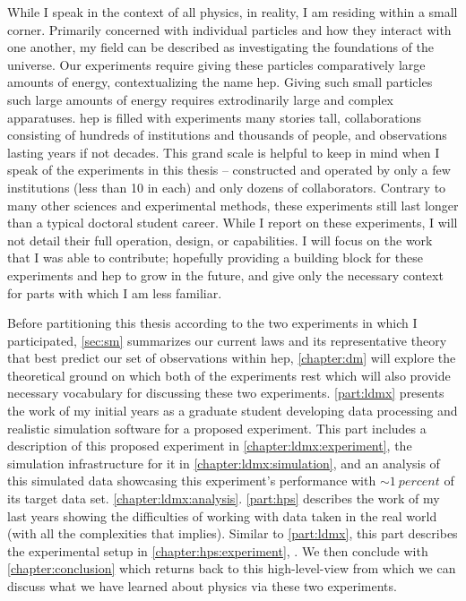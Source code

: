 While I speak in the context of all physics, in reality, I am residing within a small corner.
Primarily concerned with individual particles and how they interact with one another, my field can
be described as investigating the foundations of the universe. Our experiments require giving these
particles comparatively large amounts of energy, contextualizing the name \ac{hep}. Giving
such small particles such large amounts of energy requires extrodinarily large and complex
apparatuses. \ac{hep} is filled with experiments many stories tall, collaborations consisting of
hundreds of institutions and thousands of people, and observations lasting years if not decades.
This grand scale is helpful to keep in mind when I speak of the experiments in this thesis -- 
constructed and operated by only a few institutions (less than 10 in each) and only dozens of collaborators. Contrary to many other
sciences and experimental methods, these experiments still last longer than a typical doctoral
student career. While I report on these experiments, I will not detail their full operation,
design, or capabilities. I will focus on the work that I was able to contribute; hopefully
providing a building block for these experiments and \ac{hep} to grow in the future, and give only
the necessary context for parts with which I am less familiar.

Before partitioning this thesis according to the two experiments in which I participated,
\cref{sec:sm} summarizes our current laws and its representative theory that best predict our set
of observations within \ac{hep}, \cref{chapter:dm} will explore the theoretical ground on which
both of the experiments rest which will also provide necessary vocabulary for discussing these two
experiments. \cref{part:ldmx} presents the work of my initial years as a graduate student
developing data processing and realistic simulation software for a proposed experiment. This part
includes a description of this proposed experiment in \cref{chapter:ldmx:experiment}, the
simulation infrastructure for it in \cref{chapter:ldmx:simulation}, and an analysis of this
simulated data showcasing this experiment's performance with $\sim\qty{1}{percent}$ of its
target data set. \cref{chapter:ldmx:analysis}.
\cref{part:hps} describes the work of my last years showing the
difficulties of working with data taken in the real world (with all the complexities that implies).
Similar to \cref{part:ldmx}, this part describes the experimental setup in
\cref{chapter:hps:experiment}, . We then conclude with
\cref{chapter:conclusion} which returns back to this high-level-view from which we can discuss what
we have learned about physics via these two experiments.

